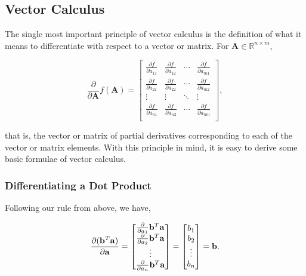 \documentclass[11pt]{amsart}
\begin{document}
\subsection{Vector Calculus}

The single most important principle of vector calculus is the definition of what it means to differentiate with respect to a vector or matrix. For $\mathbf{A} \in \mathbb{R}^{n \times m}$,

$$\frac{\partial}{\partial\mathbf{A}}f(\mathbf{A}) = \begin{bmatrix}
\frac{\partial f}{\partial a_{11}}&\frac{\partial f}{\partial a_{12}}&\cdots&\frac{\partial f}{\partial a_{m1}}\\
\frac{\partial f}{\partial a_{21}}&\frac{\partial f}{\partial a_{22}}&\cdots&\frac{\partial f}{\partial a_{m2}}\\
\vdots & \vdots & \ddots & \vdots \\
\frac{\partial f}{\partial a_{n1}}&\frac{\partial f}{\partial a_{n2}}&\cdots&\frac{\partial f}{\partial a_{nm}}\\
\end{bmatrix},$$

that is, the vector or matrix of partial derivatives corresponding to each of the vector or matrix elements. With this principle in mind, it is easy to derive some basic formulae of vector calculus.

\subsubsection{Differentiating a Dot Product}

Following our rule from above, we have,

\begin{align}
\frac{\partial(\mathbf{b}^T\mathbf{a})}{\partial\mathbf{a}} =
\begin{bmatrix}
\frac{\partial}{\partial a_1} \mathbf{b}^T\mathbf{a} \\
\frac{\partial}{\partial a_2} \mathbf{b}^T\mathbf{a} \\
\vdots \\
\frac{\partial}{\partial a_n} \mathbf{b}^T\mathbf{a} \\
\end{bmatrix}
= 
\begin{bmatrix}
b_1 \\
b_2 \\
\vdots \\
b_n \\
\end{bmatrix}
= \mathbf{b} \notag.
\end{align}
\end{document}

